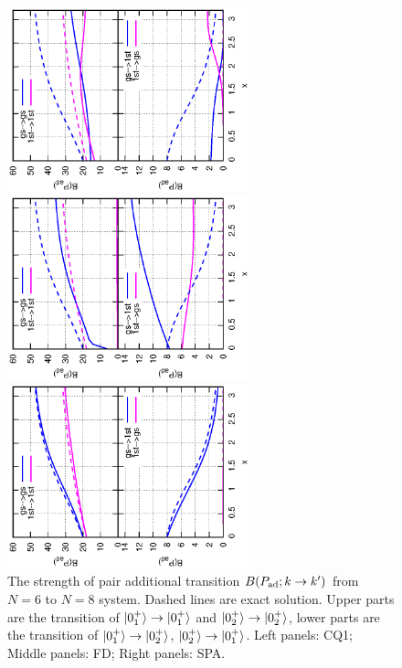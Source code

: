 \documentclass[%
superscriptaddress,
preprint,
showpacs,
nofootinbib,
amsmath,amssymb,
prc,
floatfix ]%
{revtex4-1}
\begin{document}
\begin{figure}[htbp]
 \begin{minipage}{0.3\hsize}
 \begin{center}
  \includegraphics[width=70mm,angle=-90]{images/N8Pad_CQ.eps}
 \end{center}
 \captionsetup{labelformat=empty,labelsep=none}
 \end{minipage}
 \begin{minipage}{0.3\hsize}
 \begin{center}
  \includegraphics[width=70mm,angle=-90]{images/N8Pad_FD.eps}
 \end{center}
 \captionsetup{labelformat=empty,labelsep=none}
 \end{minipage}
 \begin{minipage}{0.3\hsize}
 \begin{center}
  \includegraphics[width=70mm,angle=-90]{images/N8Pad_SPA.eps}
 \end{center}
 \captionsetup{labelformat=empty,labelsep=none}
 \end{minipage}
 \caption{The strength of pair additional transition $B(P_{\rm ad};k\rightarrow k')$ from $N=6$ to $N=8$ system. Dashed lines are exact solution. Upper parts are the transition of $\ket{0_1^+}\to\ket{0_1^+}$ and $\ket{0_2^+}\to\ket{0_2^+}$, lower parts are the transition of $\ket{0_1^+}\to\ket{0_2^+}$, $\ket{0_2^+}\to\ket{0_1^+}$. Left panels: CQ1; Middle panels: FD; Right panels: SPA.}
 \label{fig:N8Pad}
\end{figure}
\end{document}
